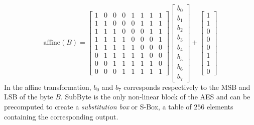 \begin{equation*}
    \text{affine}(B) = \begin{bmatrix}
     1 & 0 & 0 & 0 & 1 & 1 & 1 & 1\\
     1 & 1 & 0 & 0 & 0 & 1 & 1 & 1\\
     1 & 1 & 1 & 0 & 0 & 0 & 1 & 1\\
     1 & 1 & 1 & 1 & 0 & 0 & 0 & 1\\
     1 & 1 & 1 & 1 & 1 & 0 & 0 & 0\\
     0 & 1 & 1 & 1 & 1 & 1 & 0 & 0\\ 
     0 & 0 & 1 & 1 & 1 & 1 & 1 & 0\\
     0 & 0 & 0 & 1 & 1 & 1 & 1 & 1
    \end{bmatrix}
    \begin{bmatrix}
        b_0 \\ b_1 \\ b_2 \\ b_3 \\ b_4 \\ b_5 \\ b_6 \\ b_7
    \end{bmatrix} + 
    \begin{bmatrix}
        1 \\ 1\\ 0 \\ 0 \\ 0 \\ 1 \\ 1 \\ 0
    \end{bmatrix}
\end{equation*}
In the affine transformation, $b_0$ and $b_7$ corresponds respectively to 
the MSB and LSB of the byte $B$. SubByte is the only non-linear block of 
the AES and can be precomputed to create a \textit{substitution box} or 
S-Box, a table of $256$ elements containing the corresponding output.\\

